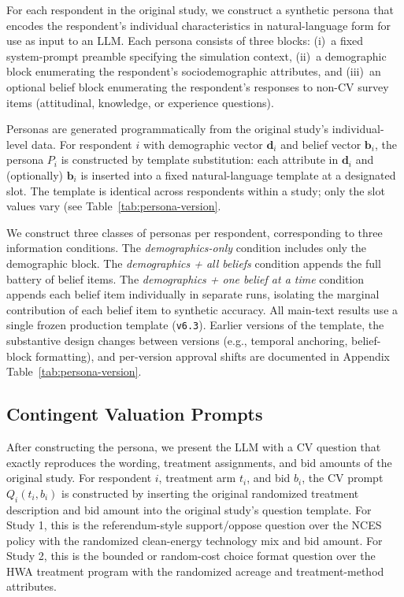 \documentclass[12pt]{article}
\begin{document}
For each respondent in the original study, we construct a synthetic persona
that encodes the respondent's individual characteristics in natural-language
form for use as input to an LLM. Each persona consists of three blocks:
(i)~a fixed system-prompt preamble specifying the simulation context,
(ii)~a demographic block enumerating the respondent's sociodemographic
attributes, and (iii)~an optional belief block enumerating the respondent's
responses to non-CV survey items (attitudinal, knowledge, or experience
questions).

Personas are generated programmatically from the original study's
individual-level data. For respondent $i$ with demographic vector
$\mathbf{d}_i$ and belief vector $\mathbf{b}_i$, the persona $P_i$ is
constructed by template substitution: each attribute in $\mathbf{d}_i$ and
(optionally) $\mathbf{b}_i$ is inserted into a fixed natural-language
template at a designated slot. The template is identical across respondents
within a study; only the slot values vary (see Table~\ref{tab:persona-version}.


We construct three classes of personas per respondent, corresponding to
three information conditions. The \textit{demographics-only} condition
includes only the demographic block. The \textit{demographics + all
beliefs} condition appends the full battery of belief items. The
\textit{demographics + one belief at a time} condition appends each belief
item individually in separate runs, isolating the marginal contribution of
each belief item to synthetic accuracy. 
All main-text results use a single frozen production template (\texttt{v6.3}). Earlier versions of the template, the substantive design changes between versions (e.g., temporal anchoring, belief-block formatting), and per-version approval shifts are documented in Appendix Table~\ref{tab:persona-version}.


\subsection{Contingent Valuation Prompts}\label{sec:methods-cv-prompts}

After constructing the persona, we present the LLM with a CV question that
exactly reproduces the wording, treatment assignments, and bid amounts of
the original study. For respondent $i$, treatment arm $t_i$, and bid $b_i$,
the CV prompt $Q_i(t_i, b_i)$ is constructed by inserting the original
randomized treatment description and bid amount into the original study's
question template. For Study 1, this is the referendum-style support/oppose
question over the NCES policy with the randomized clean-energy technology
mix and bid amount. For Study 2, this is the bounded or random-cost choice
format question over the HWA treatment program with the randomized acreage
and treatment-method attributes.
\end{document}
